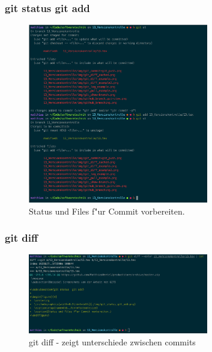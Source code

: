 \documentclass[12pt]{article}
\begin{document}
\subsubsection{git status  git add}

\begin{figure}[H]
  \centering
  \includegraphics[width=0.7\textwidth]{./img/git_status_git_add.png}
  \captionsetup{name=Abb.,font=footnotesize}
  \caption{Status und Files f"ur Commit vorbereiten.}
\end{figure}

\subsubsection{git diff}

\begin{figure}[H]
  \centering
  \includegraphics[width=0.7\textwidth]{./img/git_diff.png}
  \captionsetup{name=Abb.,font=footnotesize}
  \caption{git diff - zeigt unterschiede zwischen commits}
\end{figure}
\end{document}
